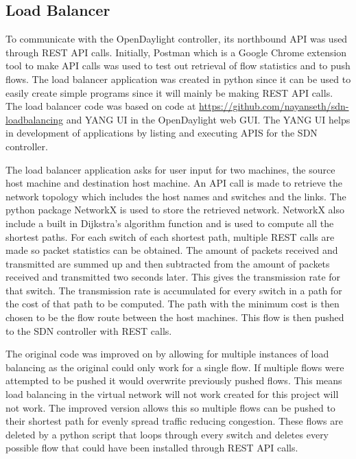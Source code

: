 \subsection{Load Balancer}
To communicate with the OpenDaylight controller, its northbound API was used through REST API calls. Initially, Postman which is a Google Chrome extension tool to make API calls was used to test out retrieval of flow statistics and to push flows. The load balancer application was created in python since it can be used to easily create simple programs since it will mainly be making REST API calls. The load balancer code was based on code at \url{https://github.com/nayanseth/sdn-loadbalancing} and YANG UI in the OpenDaylight web GUI. The YANG UI helps in development of applications by listing and executing APIS for the SDN controller.
\newline
\par
The load balancer application asks for user input for two machines, the source host machine and destination host machine. An API call is made to retrieve the network topology which includes the host names and switches and the links. The python package NetworkX is used to store the retrieved network. NetworkX also include a built in Dijkstra's algorithm function and is used to compute all the shortest paths. For each switch of each shortest path, multiple REST calls are made so packet statistics can be obtained. The amount of packets received and transmitted are summed up and then subtracted from the amount of packets received and transmitted two seconds later. This gives the transmission rate for that switch. The transmission rate is accumulated for every switch in a path for the cost of that path to be computed. The path with the minimum cost is then chosen to be the flow route between the host machines. This flow is then pushed to the SDN controller with REST calls.
\newline
\par
The original code was improved on by allowing for multiple instances of load balancing as the original could only work for a single flow. If multiple flows were attempted to be pushed it would overwrite previously pushed flows. This means load balancing in the virtual network will not work created for this project will not work. The improved version allows this so multiple flows can be pushed to their shortest path for evenly spread traffic reducing congestion. These flows are deleted by a python script that loops through every switch and deletes every possible flow that could have been installed through REST API calls.